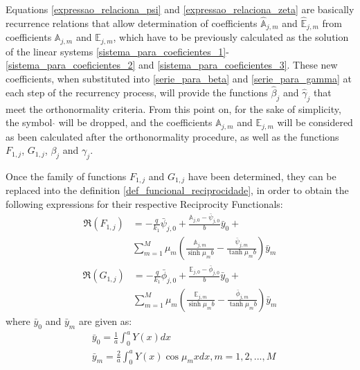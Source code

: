 \documentclass[conference,compsoc,fleqn]{IEEEtran}
\begin{document}
Equations \eqref{expressao_relaciona_psi} and \eqref{expressao_relaciona_zeta} are basically recurrence relations that allow determination of coefficients $\hat{\mathbb{A}}_{j,m}$ and $\hat{\mathbb{E}}_{j,m}$ from coefficients $\mathbb{A}_{j,m}$ and $\mathbb{E}_{j,m}$, which have to be previously calculated as the solution of the linear systems \eqref{sistema_para_coeficientes_1}-\eqref{sistema_para_coeficientes_2} and \eqref{sistema_para_coeficientes_3}. These new coefficients, when substituted into \eqref{serie_para_beta} and \eqref{serie_para_gamma} at each step of the recurrency process, will provide the functions $\hat{\beta}_j$ and $\hat{\gamma}_j$ that meet the orthonormality criteria. From this point on, for the sake of simplicity, the symbol $\hat{}$ will be dropped, and the coefficients $\mathbb{A}_{j,m}$ and $\mathbb{E}_{j,m}$ will be considered as been calculated after the orthonormality procedure, as well as the functions $F_{1,j}$, $G_{1,j}$, $\beta_j$ and $\gamma_j$.
\\


Once the family of functions $F_{1,j}$ and $G_{1,j}$ have been determined, they can be replaced into the definition \eqref{def_funcional_reciprocidade}, in order to obtain the following expressions for their respective Reciprocity Functionals:
\begin{align}
\Re(F_{1,j})
& =
-\frac{q}{k_1}\bar{\psi}_{j,0} + \frac{\mathbb{A}_{j,0} - \bar{\psi}_{j,0}}{b} \bar{y}_0 + \nonumber \\
&\sum_{m=1}^M \mu_m \left(\frac{\mathbb{A}_{j,m}}{\sinh\mu_m b} - \frac{\bar{\psi}_{j, m}}{\tanh\mu_m b}\right)\bar{y}_m
\label{calculo_FR_F1_antes_b} 
\end{align}
\begin{align}
\Re(G_{1,j})
& =
-\frac{q}{k_1}\bar{\phi}_{j,0} + \frac{\mathbb{E}_{j,0} - \bar{\phi}_{j,0}}{b} \bar{y}_0 + \nonumber \\
& \sum_{m=1}^M \mu_m \left(\frac{\mathbb{E}_{j,m}}{\sinh\mu_m b} - \frac{\bar{\phi}_{j, m}}{\tanh\mu_m b}\right)\bar{y}_m
\label{calculo_FR_G1_antes_b}
\end{align}
where $\bar{y}_0$ and $\bar{y}_m$ are given as:
\begin{align}
& \bar{y}_0 = \frac{1}{a}\int_0^a Y(x) dx \label{coef_it_0} \\ 
& \bar{y}_m = \frac{2}{a}\int_0^a Y(x) \cos\mu_m x dx, m = 1, 2, ..., M \label{coef_it_m}
\end{align}
\end{document}
